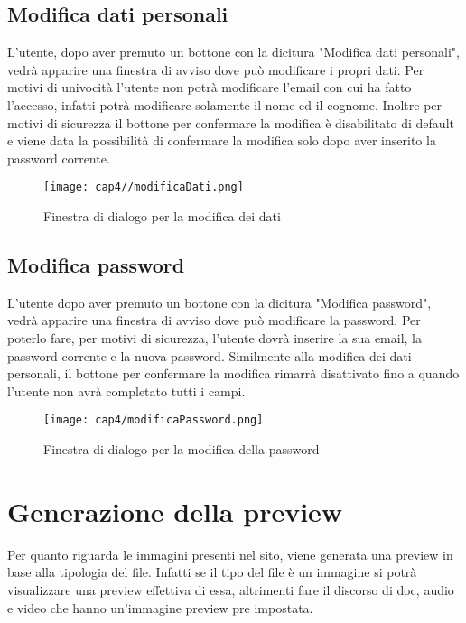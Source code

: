 \subsection{Modifica dati personali}
L'utente, dopo aver premuto un bottone con la dicitura "Modifica dati personali", vedrà apparire una finestra di avviso dove può modificare i propri dati. Per motivi di univocità l'utente non potrà modificare l'email con cui ha fatto l'accesso, infatti potrà modificare solamente il nome ed il cognome. Inoltre per motivi di sicurezza il bottone per confermare la modifica è disabilitato di default e viene data la possibilità di confermare la modifica solo dopo aver inserito la password corrente.
\begin{figure}[H]
	\begin{center}
		\texttt{[image: cap4//modificaDati.png]}
		\caption{Finestra di dialogo per la modifica dei dati}
	\end{center}
\end{figure}
\subsection{Modifica password}
L'utente dopo aver premuto un bottone con la dicitura "Modifica password", vedrà apparire una finestra di avviso dove può modificare la password. Per poterlo fare, per motivi di sicurezza, l'utente dovrà inserire la sua email, la password corrente e la nuova password. Similmente alla modifica dei dati personali, il bottone per confermare la modifica rimarrà disattivato fino a quando l'utente non avrà completato tutti i campi.
\begin{figure}[H]
	\begin{center}
		\texttt{[image: cap4/modificaPassword.png]}
		\caption{Finestra di dialogo per la modifica della password}
	\end{center}
\end{figure}

\section{Generazione della preview}

Per quanto riguarda le immagini presenti nel sito, viene generata una preview in base alla tipologia del file. Infatti se il tipo del file è un immagine si potrà visualizzare una preview effettiva di essa, altrimenti fare il discorso di doc, audio e video che hanno un'immagine preview pre impostata.